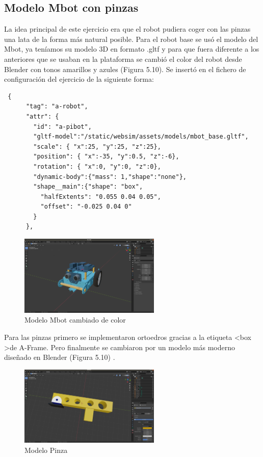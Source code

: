 \subsection{Modelo Mbot con pinzas}
La idea principal de este ejercicio era que el robot pudiera coger con las pinzas una lata de la forma más natural posible.
Para el robot base se usó el modelo del Mbot, ya teníamos su  modelo 3D en formato .gltf y para que fuera diferente a los anteriores que se usaban en la plataforma se cambió el color del robot desde Blender con tonos amarillos y azules (Figura 5.10). Se insertó en el fichero de configuración del ejercicio de la siguiente forma:

\begin{lstlisting}
 {
      "tag": "a-robot",
      "attr": {
        "id": "a-pibot",
        "gltf-model":"/static/websim/assets/models/mbot_base.gltf",
        "scale": { "x":25, "y":25, "z":25},
        "position": { "x":-35, "y":0.5, "z":-6},
        "rotation": { "x":0, "y":0, "z":0},
        "dynamic-body":{"mass": 1,"shape":"none"},
        "shape__main":{"shape": "box",
          "halfExtents": "0.055 0.04 0.05",
          "offset": "-0.025 0.04 0"
        }
      },
\end{lstlisting}

\begin{figure}[H]
  \centering
  \includegraphics[width=0.6\textwidth]{chapters/images/mbotbase.png}
	\caption{Modelo Mbot cambiado de color}  
\end{figure}


Para las pinzas  primero se implementaron ortoedros gracias a la etiqueta  \textless box \textgreater de A-Frame. Pero finalmente se cambiaron por un modelo más moderno diseñado en Blender (Figura 5.10) .

\begin{figure}[H]
  \centering
    \includegraphics[width=0.6\textwidth]{chapters/images/pinza.png}
	\caption{Modelo Pinza}    
\end{figure}


